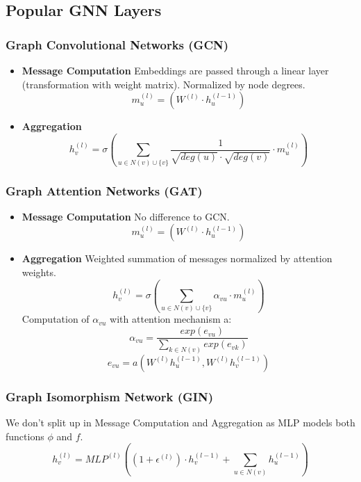 \documentclass[parskip=full]{scrartcl}
\begin{document}
\subsection{Popular GNN Layers}

\subsubsection{Graph Convolutional Networks (GCN) \cite{kipf2017semisupervised}}
\begin{itemize}
	\item[] \textbf{Message Computation}\newline
		Embeddings are passed through a linear layer (transformation with 		weight matrix). Normalized by node degrees.
		\[m_u^{(l)} = \left(W^{(l)} \cdot h_u^{(l-1)}\right)\]
	\item[] \textbf{Aggregation}\newline
		\[h_v^{(l)} = \sigma\left(\sum_{u \in N(v) \cup \{v\}} \frac{1}{\sqrt{deg(u)} \cdot \sqrt{deg(v)}} \cdot m_u^{(l)}\right)\]
\end{itemize}

\subsubsection{Graph Attention Networks (GAT) \cite{veličković2018graph}}
\begin{itemize}
	\item[] \textbf{Message Computation}\newline
		No difference to GCN.
		\[m_u^{(l)} = \left(W^{(l)} \cdot h_u^{(l-1)}\right)\]
	\item[] \textbf{Aggregation}\newline
		Weighted summation of messages normalized by attention weights.
		\[h_v^{(l)} = \sigma\left(\sum_{u \in N(v) \cup \{v\}} \alpha_{vu} \cdot m_u^{(l)}\right)\]
		Computation of $\alpha_{vu}$ with attention mechanism a:
		\[\alpha_{vu} = \frac{exp(e_{vu})}{\sum_{k \in N(v)} exp(e_{vk})}\]
		\[e_{vu} = a\left(W^{(l)}h_u^{(l-1)}, W^{(l)}h_v^{(l-1)}\right)\]
\end{itemize}

\subsubsection{Graph Isomorphism Network (GIN) \cite{xu2019powerful}}\label{GIN}
We don't split up in Message Computation and Aggregation as MLP models both functions $\phi$ and $f$.
\[h_v^{(l)} = MLP^{(l)}\left(\left(1 + \epsilon^{(l)}\right) \cdot h_v^{(l-1)} + \sum_{u \in N(v)} h_u^{(l-1)}\right)\]
\end{document}
